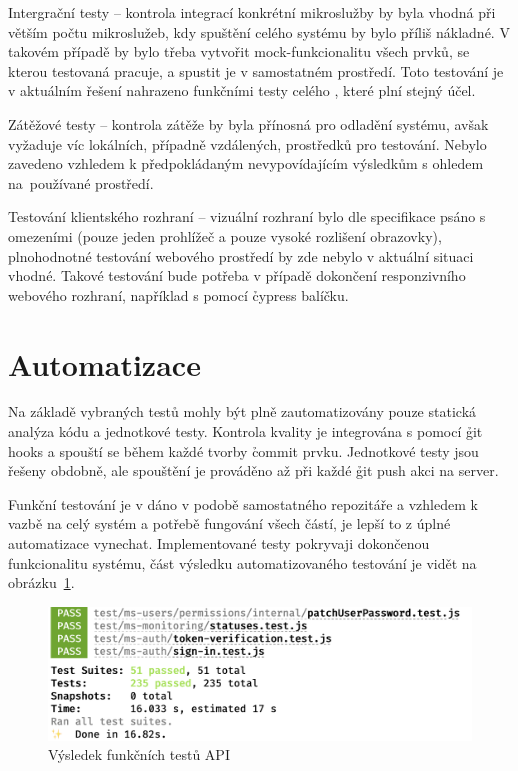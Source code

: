 \begin{dl}
   \item[Intergrační testy \g{MS}] – kontrola integrací konkrétní mikroslužby by byla vhodná při větším počtu mikroslužeb, kdy spuštění celého systému by bylo příliš nákladné.
   V takovém případě by bylo třeba vytvořit mock-funkcionalitu všech prvků, se kterou testovaná  pracuje, a spustit je v samostatném prostředí.
   Toto testování je v aktuálním řešení nahrazeno funkčními testy celého , které plní stejný účel.
   \item[Zátěžové testy] – kontrola zátěže by byla přínosná pro odladění systému, avšak vyžaduje víc lokálních, případně vzdálených, prostředků pro testování.
   Nebylo zavedeno vzhledem k předpokládaným nevypovídajícím výsledkům s ohledem na~používané prostředí.
   \item[Testování klientského rozhraní] – vizuální rozhraní bylo dle specifikace psáno s omezeními (pouze jeden prohlížeč a pouze vysoké rozlišení obrazovky), plnohodnotné testování webového prostředí by zde nebylo v aktuální situaci vhodné.
   Takové testování bude potřeba v případě dokončení responzivního webového rozhraní, například s pomocí \h{cypress} balíčku.
\end{dl}



\section{Automatizace}\label{sec:automatization}

Na základě vybraných testů mohly být plně zautomatizovány pouze statická analýza kódu a jednotkové testy.
Kontrola kvality je integrována s pomocí \h{git hooks} a spouští se během každé tvorby \h{commit} prvku.
Jednotkové testy jsou řešeny obdobně, ale spouštění je prováděno až při každé \h{git push} akci na server.

Funkční testování je v dáno v podobě samostatného repozitáře a vzhledem k vazbě na celý systém a potřebě fungování všech částí, je lepší to z úplné automatizace vynechat.
Implementované testy pokryvaji dokončenou funkcionalitu systému, část výsledku automatizovaného testování je vidět na obrázku~\ref{fig:int-test}.


\begin{figure}[htbp]
   \centering
   \includegraphics[max width=\textwidth]{assets/testing}
   \caption{Výsledek funkčních testů API}\label{fig:int-test}
\end{figure}
